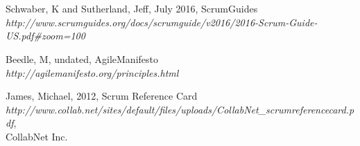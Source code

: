 \section * {}

\begin{thebibliography}{5}

         Schwaber, K and Sutherland, Jeff, July 2016, ScrumGuides \\ 
\textit{  http://www.scrumguides.org/docs/scrumguide/v2016/2016-Scrum-Guide-US.pdf#zoom=100 }
    
         Beedle, M, undated, AgileManifesto \\ 
\textit{  http://agilemanifesto.org/principles.html}
    

         James, Michael, 2012, Scrum Reference Card    \\ %
\textit{http://www.collab.net/sites/default/files/uploads/CollabNet_scrumreferencecard.pdf},\\
        CollabNet Inc.


\end{thebibliography}